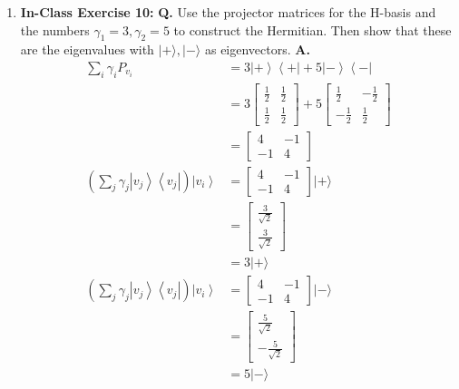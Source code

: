 \documentclass[main.tex]{subfiles}
\begin{document}
\begin{enumerate}
\item[] \textbf{In-Class Exercise 10:}  \textbf{Q.} Use the projector matrices for the H-basis and the numbers $\gamma_{1}=3, \gamma_{2}=5$ to construct the Hermitian. Then show that these are the eigenvalues with $|+\rangle, |-\rangle$ as eigenvectors.  \textbf{A.}
    \begin{align*}
        \sum_{i} \gamma_{i} P_{v_{i}}   & = 3 \left|+\right\rangle\left\langle +\right| 
                                        + 5 \left|-\right\rangle\left\langle -\right|\\
                                        & = 3 \left[\begin{array}{ll} \frac{1}{2} & \frac{1}{2} \\ \frac{1}{2} & \frac{1}{2} \end{array}\right]
                                        + 5 \left[\begin{array}{cc} \frac{1}{2} & -\frac{1}{2} \\ -\frac{1}{2} & \frac{1}{2} \end{array}\right]\\
                                        & = \left[\begin{array}{ll} 4 & -1 \\ -1 & 4 \end{array}\right]\\
        \left(\sum_{j} \gamma_{j}
        \left|v_{j}\right\rangle
        \left\langle v_{j}\right|\right)
        \left|v_{i}\right\rangle        & = \left[\begin{array}{ll} 4 & -1 \\ -1 & 4 \end{array}\right] |+\rangle \\
                                        & = \left[\begin{array}{l} \frac{3}{\sqrt{2}} \\ \frac{3}{\sqrt{2}} \end{array}\right]\\
                                        & = 3 |+\rangle\\
        \left(\sum_{j} \gamma_{j}
        \left|v_{j}\right\rangle
        \left\langle v_{j}\right|\right)
        \left|v_{i}\right\rangle        & = \left[\begin{array}{ll} 4 & -1 \\ -1 & 4 \end{array}\right] |-\rangle\\
                                        & = \left[\begin{array}{l} \frac{5}{\sqrt{2}} \\ -\frac{5}{\sqrt{2}} \end{array}\right]\\
                                        & = 5 |-\rangle
    \end{align*}


\end{enumerate}
\end{document}
